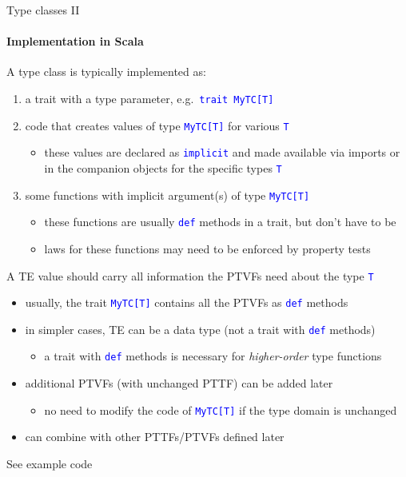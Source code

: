 \documentclass[english]{beamer}
\begin{document}
\begin{frame}{Type classes II}


\framesubtitle{Implementation in Scala}

A type class is typically implemented as:
\begin{enumerate}
\item a trait with a type parameter, e.g.\ \texttt{\textcolor{blue}{\footnotesize{}trait
MyTC{[}T{]}}}{\footnotesize \par}
\item code that creates values of type \texttt{\textcolor{blue}{\footnotesize{}MyTC{[}T{]}}}
for various \texttt{\textcolor{blue}{\footnotesize{}T}}{\footnotesize \par}
\begin{itemize}
\item these values are declared as \texttt{\textcolor{blue}{\footnotesize{}implicit}}
and made available via imports or in the companion objects for the
specific types \texttt{\textcolor{blue}{\footnotesize{}T}}{\footnotesize \par}
\end{itemize}
\item some functions with implicit argument(s) of type \texttt{\textcolor{blue}{\footnotesize{}MyTC{[}T{]}}}{\footnotesize \par}
\begin{itemize}
\item these functions are usually \texttt{\textcolor{blue}{\footnotesize{}def}}
methods in a trait, but don't have to be
\item laws for these functions may need to be enforced by property tests
\end{itemize}
\end{enumerate}
A TE value should carry all information the PTVFs need about the type
\texttt{\textcolor{blue}{\footnotesize{}T}}{\footnotesize \par}
\begin{itemize}
\item usually, the trait \texttt{\textcolor{blue}{\footnotesize{}MyTC{[}T{]}}}
contains all the PTVFs as \texttt{\textcolor{blue}{\footnotesize{}def}}
methods
\item in simpler cases, TE can be a data type (not a trait with \texttt{\textcolor{blue}{\footnotesize{}def}}
methods)
\begin{itemize}
\item a trait with \texttt{\textcolor{blue}{\footnotesize{}def}} methods
is necessary for \emph{higher-order} type functions
\end{itemize}
\item additional PTVFs (with unchanged PTTF) can be added later
\begin{itemize}
\item no need to modify the code of \texttt{\textcolor{blue}{\footnotesize{}MyTC{[}T{]}}}
if the type domain is unchanged
\end{itemize}
\item can combine with other PTTFs/PTVFs defined later
\end{itemize}
See example code
\end{frame}
\end{document}
